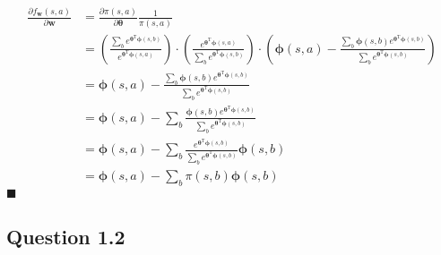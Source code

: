 \documentclass[a4paper]{article}
\newcommand*{\QEDA}{\hfill\ensuremath{\blacksquare}}%
\begin{document}
\begin{align*}
  \frac{\partial f_{\boldsymbol{w}}(s, a)}{\partial \boldsymbol{w}}
  &=\frac{\partial \pi(s, a)}{\partial \boldsymbol{\theta}} \frac{1}{\pi(s, a)}\\
  &=\left(\frac{\sum_{b} e^{\boldsymbol{\theta}^{\mathrm{T}} \boldsymbol{\phi}(s, b)}}
               {e^{\boldsymbol{\theta}^{\mathrm{T}} \boldsymbol{\phi}(s, a)}}\right)
    \cdot
    \left(\frac{e^{\boldsymbol{\theta}^{\mathrm{T}} \boldsymbol{\phi}(s, a)}}
         {\sum_{b} e^{\boldsymbol{\theta}^{\mathrm{T}} \boldsymbol{\phi}(s, b)}}\right)
    \cdot
    \left(
    \boldsymbol{\phi}(s, a)-
    \frac{\sum_{b} \boldsymbol{\phi}(s, b)e^{\boldsymbol{\theta}^{\mathrm{T}} \boldsymbol{\phi}(s, b)}}
         {\sum_{b} e^{\boldsymbol{\theta}^{\mathrm{T}} \boldsymbol{\phi}(s, b)}}
    \right)\\
    &=
    \boldsymbol{\phi}(s, a)-
    \frac{\sum_{b} \boldsymbol{\phi}(s, b)e^{\boldsymbol{\theta}^{\mathrm{T}} \boldsymbol{\phi}(s, b)}}
         {\sum_{b} e^{\boldsymbol{\theta}^{\mathrm{T}} \boldsymbol{\phi}(s, b)}}\\
    &=
    \boldsymbol{\phi}(s, a)-
    \sum_{b} \frac{\boldsymbol{\phi}(s, b)e^{\boldsymbol{\theta}^{\mathrm{T}} \boldsymbol{\phi}(s, b)}}
         {\sum_{b} e^{\boldsymbol{\theta}^{\mathrm{T}} \boldsymbol{\phi}(s, b)}}\\
    &=
    \boldsymbol{\phi}(s, a)-
    \sum_{b} \frac{e^{\boldsymbol{\theta}^{\mathrm{T}} \boldsymbol{\phi}(s, b)}}
        {\sum_{b} e^{\boldsymbol{\theta}^{\mathrm{T}} \boldsymbol{\phi}(s, b)}
        }\boldsymbol{\phi}(s, b)\\
    &=
    \boldsymbol{\phi}(s, a)-
    \sum_{b}
    \pi(s, b)
    \boldsymbol{\phi}(s, b)
\end{align*}
\QEDA

\subsection*{Question 1.2}
\label{subsec:11}
\end{document}
